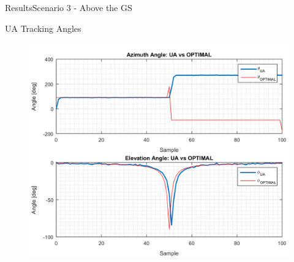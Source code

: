 \begin{frame}{Results}{Scenario 3 - Above the GS}
\begin{block}{UA Tracking Angles}
\begin{figure}[H]
{{    \includegraphics[scale=0.35]{figures/s3_ua.png}}}
  \end{figure}
  
  \end{block}

\end{frame}



